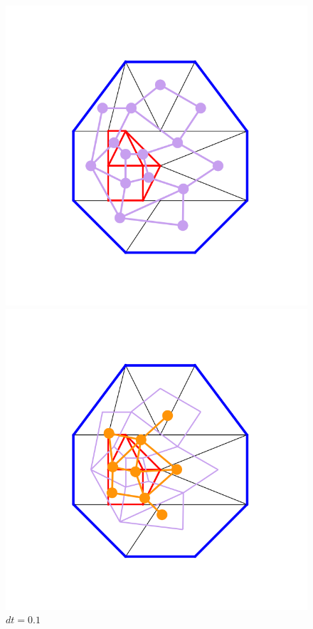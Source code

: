 \documentclass[10pt]{article}
\begin{document}
\begin{figure}[H]
    \centering
    \begin{minipage}{.33\linewidth}
        \centering
        \includegraphics[width=1\textwidth]{images/Figure_2.png}
        \caption{$dt=0.1$}
        \label{fig:prob1_6_2}
    \end{minipage}%
    \begin{minipage}{.33\linewidth}
        \centering
        \includegraphics[width=1\textwidth]{images/Figure_4.png}

\end{minipage}
\end{figure}
\end{document}

